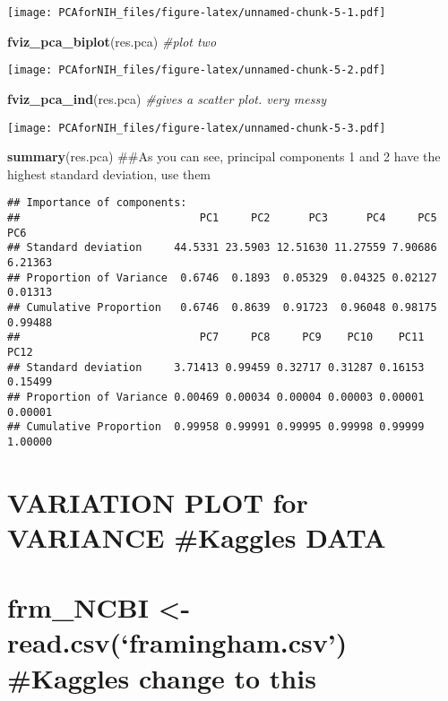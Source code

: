 \documentclass[]{article}
\newenvironment{Shaded}{\begin{snugshade}}{\end{snugshade}}
\newcommand{\KeywordTok}[1]{\textcolor[rgb]{0.13,0.29,0.53}{\textbf{#1}}}
\newcommand{\CommentTok}[1]{\textcolor[rgb]{0.56,0.35,0.01}{\textit{#1}}}
\newcommand{\NormalTok}[1]{#1}
\begin{document}
\texttt{[image: PCAforNIH\_files/figure-latex/unnamed-chunk-5-1.pdf]}

\begin{Shaded}
\begin{Highlighting}[]
\KeywordTok{fviz_pca_biplot}\NormalTok{(res.pca) }\CommentTok{#plot two}
\end{Highlighting}
\end{Shaded}

\texttt{[image: PCAforNIH\_files/figure-latex/unnamed-chunk-5-2.pdf]}

\begin{Shaded}
\begin{Highlighting}[]
\KeywordTok{fviz_pca_ind}\NormalTok{(res.pca) }\CommentTok{#gives a scatter plot. very messy}
\end{Highlighting}
\end{Shaded}

\texttt{[image: PCAforNIH\_files/figure-latex/unnamed-chunk-5-3.pdf]}

\begin{Shaded}
\begin{Highlighting}[]
\KeywordTok{summary}\NormalTok{(res.pca) ##As you can see, principal components 1 and 2 have the highest standard deviation, use them}
\end{Highlighting}
\end{Shaded}

\begin{verbatim}
## Importance of components:
##                            PC1     PC2      PC3      PC4     PC5     PC6
## Standard deviation     44.5331 23.5903 12.51630 11.27559 7.90686 6.21363
## Proportion of Variance  0.6746  0.1893  0.05329  0.04325 0.02127 0.01313
## Cumulative Proportion   0.6746  0.8639  0.91723  0.96048 0.98175 0.99488
##                            PC7     PC8     PC9    PC10    PC11    PC12
## Standard deviation     3.71413 0.99459 0.32717 0.31287 0.16153 0.15499
## Proportion of Variance 0.00469 0.00034 0.00004 0.00003 0.00001 0.00001
## Cumulative Proportion  0.99958 0.99991 0.99995 0.99998 0.99999 1.00000
\end{verbatim}

\section{VARIATION PLOT for VARIANCE \#Kaggles
DATA}\label{variation-plot-for-variance-kaggles-data}

\section{\texorpdfstring{frm\_NCBI \textless{}-
read.csv(`framingham.csv') \#Kaggles change to
this}{frm\_NCBI \textless{}- read.csv(framingham.csv) \#Kaggles change to this}}\label{frm_ncbi---read.csvframingham.csv-kaggles-change-to-this}
\end{document}
